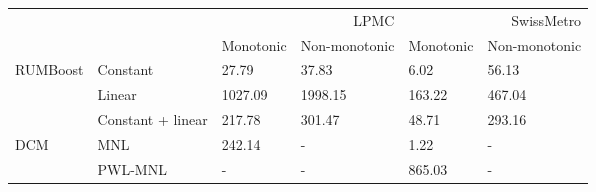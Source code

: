 \begin{tabular}{llllll}
\toprule
 &  & \multicolumn{2}{r}{LPMC} & \multicolumn{2}{r}{SwissMetro} \\
 &  & Monotonic & Non-monotonic & Monotonic & Non-monotonic \\
\midrule
\multirow[t]{3}{*}{RUMBoost} & Constant & 27.79 & 37.83 & 6.02 & 56.13 \\
 & Linear & 1027.09 & 1998.15 & 163.22 & 467.04 \\
 & Constant + linear & 217.78 & 301.47 & 48.71 & 293.16 \\
\cline{1-6}
\multirow[t]{2}{*}{DCM} & MNL & 242.14 & - & 1.22 & - \\
 & PWL-MNL & - & - & 865.03 & - \\
\cline{1-6}
\bottomrule
\end{tabular}
